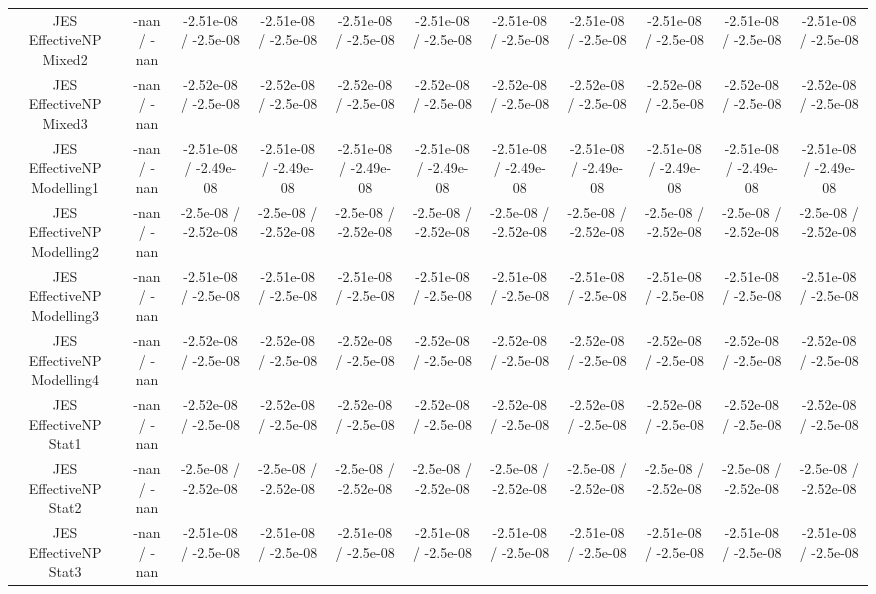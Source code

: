 \begin{table}[htbp]
\begin{center}
\begin{tabular}{|c|c|c|c|c|c|c|c|c|c|c|}
  JES EffectiveNP Mixed2 & -nan / -nan & -2.51e-08 / -2.5e-08 & -2.51e-08 / -2.5e-08 & -2.51e-08 / -2.5e-08 & -2.51e-08 / -2.5e-08 & -2.51e-08 / -2.5e-08 & -2.51e-08 / -2.5e-08 & -2.51e-08 / -2.5e-08 & -2.51e-08 / -2.5e-08 & -2.51e-08 / -2.5e-08 \\ 
  JES EffectiveNP Mixed3 & -nan / -nan & -2.52e-08 / -2.5e-08 & -2.52e-08 / -2.5e-08 & -2.52e-08 / -2.5e-08 & -2.52e-08 / -2.5e-08 & -2.52e-08 / -2.5e-08 & -2.52e-08 / -2.5e-08 & -2.52e-08 / -2.5e-08 & -2.52e-08 / -2.5e-08 & -2.52e-08 / -2.5e-08 \\ 
  JES EffectiveNP Modelling1 & -nan / -nan & -2.51e-08 / -2.49e-08 & -2.51e-08 / -2.49e-08 & -2.51e-08 / -2.49e-08 & -2.51e-08 / -2.49e-08 & -2.51e-08 / -2.49e-08 & -2.51e-08 / -2.49e-08 & -2.51e-08 / -2.49e-08 & -2.51e-08 / -2.49e-08 & -2.51e-08 / -2.49e-08 \\ 
  JES EffectiveNP Modelling2 & -nan / -nan & -2.5e-08 / -2.52e-08 & -2.5e-08 / -2.52e-08 & -2.5e-08 / -2.52e-08 & -2.5e-08 / -2.52e-08 & -2.5e-08 / -2.52e-08 & -2.5e-08 / -2.52e-08 & -2.5e-08 / -2.52e-08 & -2.5e-08 / -2.52e-08 & -2.5e-08 / -2.52e-08 \\ 
  JES EffectiveNP Modelling3 & -nan / -nan & -2.51e-08 / -2.5e-08 & -2.51e-08 / -2.5e-08 & -2.51e-08 / -2.5e-08 & -2.51e-08 / -2.5e-08 & -2.51e-08 / -2.5e-08 & -2.51e-08 / -2.5e-08 & -2.51e-08 / -2.5e-08 & -2.51e-08 / -2.5e-08 & -2.51e-08 / -2.5e-08 \\ 
  JES EffectiveNP Modelling4 & -nan / -nan & -2.52e-08 / -2.5e-08 & -2.52e-08 / -2.5e-08 & -2.52e-08 / -2.5e-08 & -2.52e-08 / -2.5e-08 & -2.52e-08 / -2.5e-08 & -2.52e-08 / -2.5e-08 & -2.52e-08 / -2.5e-08 & -2.52e-08 / -2.5e-08 & -2.52e-08 / -2.5e-08 \\ 
  JES EffectiveNP Stat1 & -nan / -nan & -2.52e-08 / -2.5e-08 & -2.52e-08 / -2.5e-08 & -2.52e-08 / -2.5e-08 & -2.52e-08 / -2.5e-08 & -2.52e-08 / -2.5e-08 & -2.52e-08 / -2.5e-08 & -2.52e-08 / -2.5e-08 & -2.52e-08 / -2.5e-08 & -2.52e-08 / -2.5e-08 \\ 
  JES EffectiveNP Stat2 & -nan / -nan & -2.5e-08 / -2.52e-08 & -2.5e-08 / -2.52e-08 & -2.5e-08 / -2.52e-08 & -2.5e-08 / -2.52e-08 & -2.5e-08 / -2.52e-08 & -2.5e-08 / -2.52e-08 & -2.5e-08 / -2.52e-08 & -2.5e-08 / -2.52e-08 & -2.5e-08 / -2.52e-08 \\ 
  JES EffectiveNP Stat3 & -nan / -nan & -2.51e-08 / -2.5e-08 & -2.51e-08 / -2.5e-08 & -2.51e-08 / -2.5e-08 & -2.51e-08 / -2.5e-08 & -2.51e-08 / -2.5e-08 & -2.51e-08 / -2.5e-08 & -2.51e-08 / -2.5e-08 & -2.51e-08 / -2.5e-08 & -2.51e-08 / -2.5e-08 \\ 

\end{tabular}
\end{center}
\end{table}
